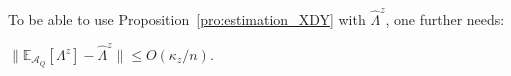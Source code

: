 \documentclass[a4papaer, titlepage]{book}
\begin{document}
To be able to use Proposition~\ref{pro:estimation_XDY} with $\hat \Lambda^z$, one further needs:

\begin{lemma}\label{lem:lambda_lambda_hat_proche}
  $\| \mathbb E_{\mathcal A_Q} [\Lambda^z] - \hat \Lambda^z \|  \leq O (\kappa_z/ n)$.
\end{lemma}
\end{document}
